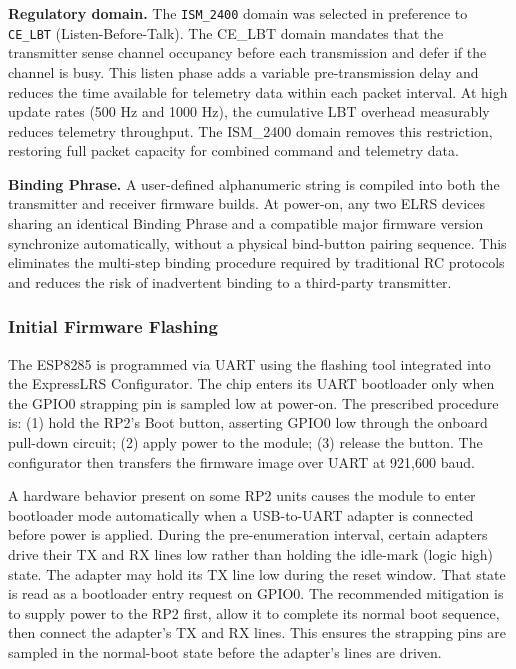 \textbf{Regulatory domain.}
The \texttt{ISM\_2400} domain was selected in preference to \texttt{CE\_LBT}
(Listen-Before-Talk).
The CE\_LBT domain mandates that the transmitter sense channel occupancy before each
transmission and defer if the channel is busy.
This listen phase adds a variable pre-transmission delay and reduces the time available for
telemetry data within each packet interval.
At high update rates (500 Hz and 1000 Hz), the cumulative LBT overhead measurably reduces
telemetry throughput.
The ISM\_2400 domain removes this restriction, restoring full packet capacity for combined
command and telemetry data.

\textbf{Binding Phrase.}
A user-defined alphanumeric string is compiled into both the transmitter and receiver firmware
builds.
At power-on, any two ELRS devices sharing an identical Binding Phrase and a compatible major
firmware version synchronize automatically, without a physical bind-button pairing sequence.
This eliminates the multi-step binding procedure required by traditional RC protocols and reduces
the risk of inadvertent binding to a third-party transmitter.

\subsubsection{Initial Firmware Flashing}
\label{subsubsec:flashing}

The ESP8285 is programmed via UART using the flashing tool integrated into the ExpressLRS
Configurator.
The chip enters its UART bootloader only when the GPIO0 strapping pin is sampled low at
power-on.
The prescribed procedure is: (1) hold the RP2's Boot button, asserting GPIO0 low through the
onboard pull-down circuit; (2) apply power to the module; (3) release the button.
The configurator then transfers the firmware image over UART at 921,600 baud.

A hardware behavior present on some RP2 units causes the module to enter bootloader mode
automatically when a USB-to-UART adapter is connected before power is applied.
During the pre-enumeration interval, certain adapters drive their TX and RX lines low rather than
holding the idle-mark (logic high) state.
The adapter may hold its TX line low during the reset window.
That state is read as a bootloader entry request on GPIO0.
The recommended mitigation is to supply power to the RP2 first, allow it to complete its normal
boot sequence, then connect the adapter's TX and RX lines.
This ensures the strapping pins are sampled in the normal-boot state before the adapter's lines
are driven.

